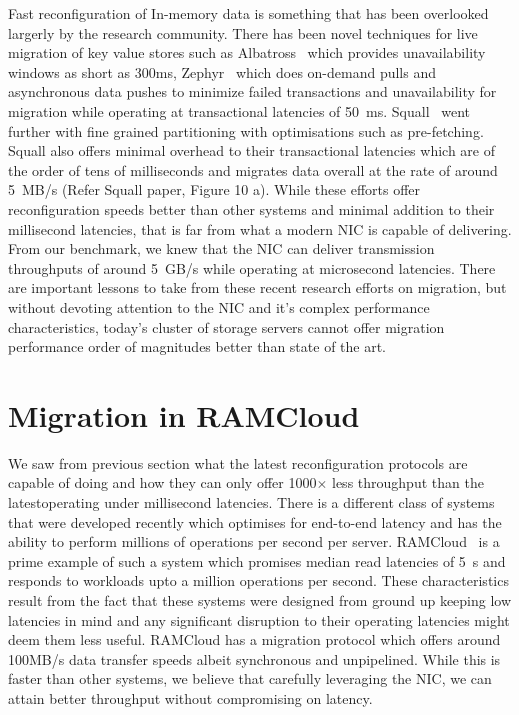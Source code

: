 Fast reconfiguration of In-memory data is something that has been overlooked largerly
by the research community. There has been novel techniques for live migration of 
key value stores such as Albatross~\cite{albatross} which provides unavailability windows 
as short as 300ms, Zephyr~\cite{zephyr} which does on-demand pulls and asynchronous data 
pushes to minimize failed transactions and unavailability for migration while operating 
at transactional latencies of 50~ms. Squall~\cite{squall} went further with fine grained 
partitioning with optimisations such as pre-fetching. Squall also offers minimal overhead 
to their transactional latencies which are of the order of tens of milliseconds and migrates 
data overall at the rate of around 5~MB/s (Refer Squall paper, Figure 10 a). While these efforts offer reconfiguration speeds 
better than other systems and minimal addition to their millisecond latencies, that is far 
from what a modern NIC is capable of delivering. From our benchmark, we knew that the NIC 
can deliver transmission throughputs of around 5~GB/s while operating at microsecond latencies. 
There are important lessons to take from these recent research efforts on migration, but without 
devoting attention to the NIC and it's complex performance characteristics, today's cluster of
storage servers cannot offer migration performance order of magnitudes better than state of the art.

\section{Migration in RAMCloud}
We saw from previous section what the latest reconfiguration protocols are capable of doing and how they can only 
offer 1000$\times$ less throughput than the latestoperating under millisecond latencies. There is a different class of systems~\cite{ramcloud,farm,rdmabillion,herd} that 
were developed recently which optimises for end-to-end latency and has the ability to perform millions of operations 
per second per server. RAMCloud~\cite{ramcloud} is a prime example of such a system which promises median read latencies 
of 5\textmu~s and responds to workloads upto a million operations per second. These characteristics result from the fact that 
these systems were designed from ground up keeping low latencies in mind and any significant disruption to their operating 
latencies might deem them less useful. RAMCloud has a migration protocol which offers around 100MB/s data transfer speeds albeit 
synchronous and unpipelined. While this is faster than other systems, we believe that carefully leveraging the NIC, 
we can attain better throughput without compromising on latency.

